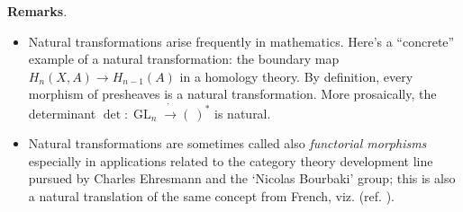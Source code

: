 \documentclass{article}
\DeclareMathOperator{\GL}{GL}
\begin{document}


\textbf{Remarks}.  
\begin{itemize}
\item
Natural transformations arise frequently in mathematics.  Here's a ``concrete'' example of a natural transformation: the boundary map $H_n(X,A)\to H_{n-1}(A)$ in a homology theory. By definition, every morphism of presheaves is a natural transformation.
More prosaically, the determinant 
$\det:\GL_n\dot{\to}(\ )^*$
is natural.
\item
Natural transformations are sometimes called also \emph{functorial morphisms} especially in applications related to the category theory development line pursued by Charles Ehresmann and the `Nicolas Bourbaki' group; this is also a natural translation of the same concept from French, viz. (ref. \cite{CE1965}).
\end{itemize}
\end{document}
